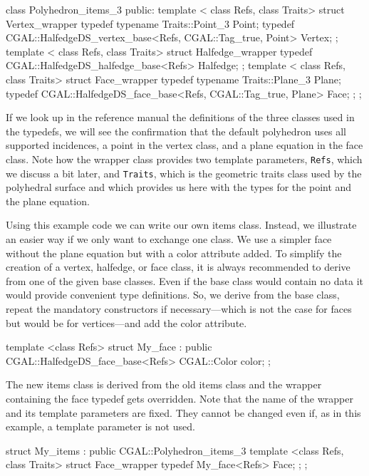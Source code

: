 \begin{ccExampleCode}
class Polyhedron_items_3 {
public:
    template < class Refs, class Traits>
    struct Vertex_wrapper {
        typedef typename Traits::Point_3 Point;
        typedef CGAL::HalfedgeDS_vertex_base<Refs, CGAL::Tag_true, Point> Vertex;
    };
    template < class Refs, class Traits>
    struct Halfedge_wrapper {
        typedef CGAL::HalfedgeDS_halfedge_base<Refs>                      Halfedge;
    };
    template < class Refs, class Traits>
    struct Face_wrapper {
        typedef typename Traits::Plane_3 Plane;
        typedef CGAL::HalfedgeDS_face_base<Refs, CGAL::Tag_true, Plane>   Face;
    };
};
\end{ccExampleCode}

If we look up in the reference manual the definitions of the three
classes used in the typedefs, we will see the confirmation that the
default polyhedron uses all supported incidences, a point in the
vertex class, and a plane equation in the face class. Note how the
wrapper class provides two template parameters, \texttt{Refs}, which
we discuss a bit later, and \texttt{Traits}, which is the geometric
traits class used by the polyhedral surface and which provides us here
with the types for the point and the plane equation.

Using this example code we can write our own items class. Instead, we
illustrate an easier way if we only want to exchange one class. We use
a simpler face without the plane equation but with a color attribute
added. To simplify the creation of a vertex, halfedge, or face class,
it is always recommended to derive from one of the given base classes.
Even if the base class would contain no data it would provide
convenient type definitions. So, we derive from the base class, repeat
the mandatory constructors if necessary---which is not the case for
faces but would be for vertices---and add the color attribute.

\begin{ccExampleCode}
template <class Refs>
struct My_face : public CGAL::HalfedgeDS_face_base<Refs> {
    CGAL::Color color;
};
\end{ccExampleCode}

The new items class is derived from the old items class and the
wrapper containing the face typedef gets overridden. Note that the
name of the wrapper and its template parameters are fixed. They cannot
be changed even if, as in this example, a template parameter is not
used.

\begin{ccExampleCode}
struct My_items : public CGAL::Polyhedron_items_3 {
    template <class Refs, class Traits>
    struct Face_wrapper {
        typedef My_face<Refs> Face;
    };
};
\end{ccExampleCode}

